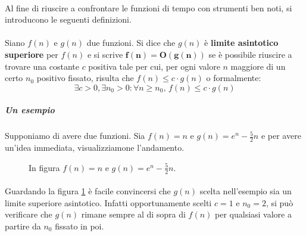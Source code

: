 \documentclass[11pt,a4paper,oneside]{article}
\begin{document}
\paragraph*{} Al fine di riuscire a confrontare le funzioni di tempo con strumenti ben noti, si introducono le seguenti definizioni.
\paragraph{} Siano $f(n)$ e $g(n)$ due funzioni. Si dice che $g(n)$ è \textbf{limite asintotico superiore} per $f(n)$ e si scrive $\bm{f(n) = O(g(n))}$ se è possibile riuscire a trovare una costante $c$ positiva tale per cui, per ogni valore $n$ maggiore di un certo $n_0$ positivo fissato, risulta che $f(n) \leq  c\cdot g(n)$ o formalmente: $$\exists c>0, \exists n_0 > 0 : \forall n \geq n_0,\,f(n) \leq c\cdot g(n)$$
\subparagraph*{Un esempio} Supponiamo di avere due funzioni. Sia $f(n) = n$ e $g(n) = e^n-\frac{5}{2}n$ e per avere un'idea immediata, visualizziamone l'andamento.

\begin{figure}[hb]
\centering
{}
\caption{In figura $f(n) = n$ e $g(n) = e^n-\frac{5}{2}n$.}
\label{fig:asymsup}
\end{figure}

\paragraph*{}Guardando la figura \ref{fig:asymsup} è facile convincersi che $g(n)$ scelta nell'esempio sia un limite superiore asintotico. Infatti opportunamente scelti $c = 1$ e $n_0 = 2$, si può verificare che $g(n)$ rimane sempre al di sopra di $f(n)$ per qualsiasi valore a partire da $n_0$ fissato in poi.\\
\end{document}
